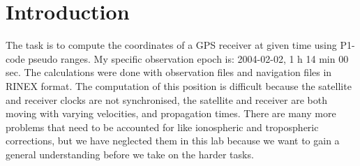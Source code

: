 \section{Introduction} %
\label{sec:introduction}

The task is to compute the coordinates of a GPS receiver at given time using P1-code pseudo ranges.  My specific observation epoch is: 2004-02-02, 1 h 14 min 00 sec.  The calculations were done with observation files and navigation files in RINEX format.  The computation of this position is difficult because  the satellite and receiver clocks are not synchronised, the satellite and receiver are both moving with varying velocities, and propagation times.  There are many more problems that need to be accounted for like ionospheric and tropospheric corrections, but we have neglected them in this lab because we want to gain a general understanding before we take on the harder tasks.

